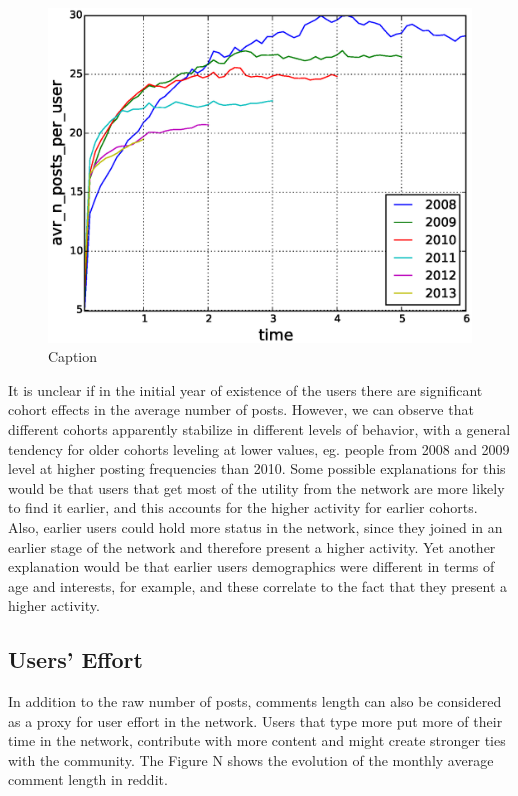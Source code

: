 \begin{figure}[!tb]
\centering
\includegraphics[scale=0.4]{./images/avr_posts_per_user_cohorts.eps}
\caption{Caption}
\label{fig:avr_posts_per_user_cohorts}
\end{figure}

It is unclear if in the initial year of existence of the users there are significant cohort effects in the average number of posts. However, we can observe that different cohorts apparently stabilize in different levels of behavior, with a general tendency for older cohorts leveling at lower values, eg. people from 2008 and 2009 level at higher posting frequencies than 2010. Some possible explanations for this would be that users that get most of the utility from the network are more likely to find it earlier, and this accounts for the higher activity for earlier cohorts. Also, earlier users could hold more status in the network, since they joined in an earlier stage of the network and therefore present a higher activity. Yet another explanation would be that earlier users demographics were different in terms of age and interests, for example, and these correlate to the fact that they present a higher activity.

\subsection{Users' Effort}

In addition to the raw number of posts, comments length can also be considered as a proxy for user effort in the network. Users that type more put more of their time in the network, contribute with more content and might create stronger ties with the community. The Figure N shows the evolution of the monthly average comment length in reddit.

